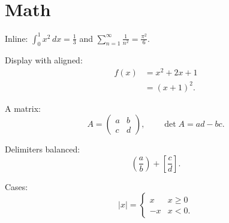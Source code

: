 \documentclass{article}
\begin{document}
\section{Math}
Inline: $\int_0^1 x^2\,dx = \tfrac{1}{3}$ and $\sum_{n=1}^{\infty}\frac{1}{n^2}=\frac{\pi^2}{6}$.

Display with aligned:
\begin{align}
  f(x) &= x^2 + 2x + 1 \\
       &= (x+1)^2.
\end{align}

A matrix:
\[
  A = \begin{pmatrix} a & b \\ c & d \end{pmatrix},\qquad
  \det A = ad - bc.
\]

Delimiters balanced:
\[
  \left( \frac{a}{b} \right) + \left[ \frac{c}{d} \right].
\]

Cases:
\[
  |x| = \begin{cases} x & x \ge 0 \\ -x & x < 0. \end{cases}
\]
\end{document}

